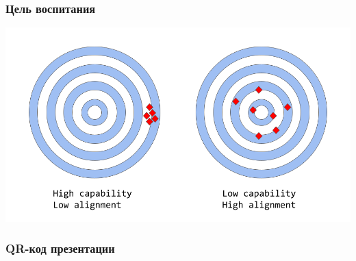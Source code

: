 \documentclass[10pt]{beamer}
\begin{document}
\begin{frame}
  \frametitle{Цель воспитания}
  \begin{center}
    \includegraphics[width=1\linewidth]{pics/capability-versus-alignment.png}
  \end{center}
\end{frame}

\begin{frame}
  \frametitle{QR-код презентации}
  \centering
\end{frame}
\end{document}
